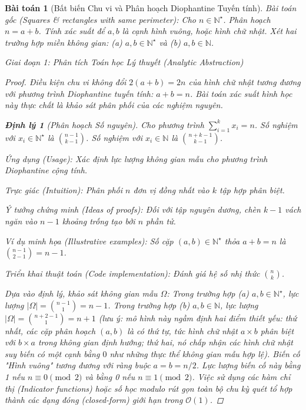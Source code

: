 \documentclass{article}
\newtheorem{baitoan}{Bài toán}
\newtheorem{dinhly}{Định lý}
\begin{document}
\begin{baitoan}[Bất biến Chu vi và Phân hoạch Diophantine Tuyến tính]
 \emph{Bài toán gốc (Squares \& rectangles with same perimeter):} 
 Cho $n\in\mathbb{N}^\star$. Phân hoạch $n = a + b$. Tính xác suất để $a,b$ là cạnh hình vuông, hoặc hình chữ nhật. Xét hai trường hợp miền không gian: (a) $a,b\in\mathbb{N}^\star$ và (b) $a,b\in\mathbb{N}$.

\vspace{0.5em}\noindent\emph{Giai đoạn 1: Phân tích Toán học Lý thuyết (Analytic Abstraction)}
 
 \begin{proof}
 Điều kiện chu vi không đổi $2(a+b) = 2n$ của hình chữ nhật tương đương với phương trình Diophantine tuyến tính: $a + b = n$. 
 Bài toán xác suất hình học này thực chất là khảo sát phân phối của các nghiệm nguyên. 

\begin{dinhly}[Phân hoạch Số nguyên]
Cho phương trình $\sum_{i=1}^{k} x_i = n$.
Số nghiệm với $x_i \in \mathbb{N}^\star$ là $\binom{n-1}{k-1}$.
Số nghiệm với $x_i \in \mathbb{N}$ là $\binom{n+k-1}{k-1}$.
\end{dinhly}

\emph{Ứng dụng (Usage):} Xác định lực lượng không gian mẫu cho phương trình Diophantine cộng tính.

\emph{Trực giác (Intuition):} Phân phối $n$ đơn vị đồng nhất vào $k$ tập hợp phân biệt.

\emph{Ý tưởng chứng minh (Ideas of proofs):} Đối với tập nguyên dương, chèn $k-1$ vách ngăn vào $n-1$ khoảng trống tạo bởi $n$ phần tử.

\emph{Ví dụ minh họa (Illustrative examples):} Số cặp $(a,b) \in \mathbb{N}^\star$ thỏa $a+b=n$ là $\binom{n-1}{2-1} = n-1$.

\emph{Triển khai thuật toán (Code implementation):}
Đánh giá hệ số nhị thức $\binom{n}{k}$.


 Dựa vào định lý, khảo sát không gian mẫu $\Omega$:
 Trong trường hợp (a) $a,b \in \mathbb{N}^\star$, lực lượng $|\Omega| = \binom{n-1}{1} = n - 1$. 
 Trong trường hợp (b) $a,b \in \mathbb{N}$, lực lượng $|\Omega| = \binom{n+2-1}{1} = n + 1$ (lưu ý: mô hình này ngầm định hai điểm thiết yếu: thứ nhất, các cặp phân hoạch $(a,b)$ là có thứ tự, tức hình chữ nhật $a \times b$ phân biệt với $b \times a$ trong không gian định hướng; thứ hai, nó chấp nhận các hình chữ nhật suy biến có một cạnh bằng $0$ như những thực thể không gian mẫu hợp lệ).
 Biến cố "Hình vuông" tương đương với ràng buộc $a = b = n/2$. Lực lượng biến cố này bằng 1 nếu $n \equiv 0 \pmod 2$ và bằng 0 nếu $n \equiv 1 \pmod 2$. 
 Việc sử dụng các hàm chỉ thị (Indicator functions) hoặc số học modulo rút gọn toàn bộ chu kỳ quét tổ hợp thành các dạng đóng (closed-form) giới hạn trong $\mathcal{O}(1)$.
 \end{proof}


\end{baitoan}
\end{document}
